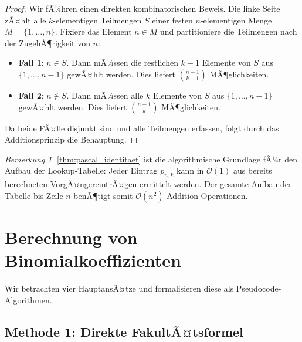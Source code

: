 ﻿\documentclass[12pt, a4paper]{article}
\newcommand{\Oh}{\mathcal{O}}
\theoremstyle{plain}
\theoremstyle{definition}
\theoremstyle{remark}
\newtheorem{bemerkung}[theorem]{Bemerkung}
\renewcommand{\Oh}{\mathcal{O}}
\begin{document}
\begin{proof}
  Wir fÃ¼hren einen direkten kombinatorischen Beweis. Die linke Seite
  zÃ¤hlt alle $k$-elementigen Teilmengen $S$ einer festen
  $n$-elementigen Menge $M = \{1, \ldots, n\}$. Fixiere das Element
  $n \in M$ und partitioniere die Teilmengen nach der ZugehÃ¶rigkeit
  von $n$:
  \begin{itemize}
    \item \textbf{Fall 1}: $n \in S$. Dann mÃ¼ssen die restlichen
          $k-1$ Elemente von $S$ aus $\{1,\ldots,n-1\}$ gewÃ¤hlt werden.
          Dies liefert $\binom{n-1}{k-1}$ MÃ¶glichkeiten.
    \item \textbf{Fall 2}: $n \notin S$. Dann mÃ¼ssen alle $k$ Elemente
          von $S$ aus $\{1,\ldots,n-1\}$ gewÃ¤hlt werden. Dies liefert
          $\binom{n-1}{k}$ MÃ¶glichkeiten.
  \end{itemize}
  Da beide FÃ¤lle disjunkt sind und alle Teilmengen erfassen, folgt
  durch das Additionsprinzip die Behauptung.
\end{proof}

\begin{bemerkung}
  \cref{thm:pascal_identitaet} ist die algorithmische Grundlage fÃ¼r
  den Aufbau der Lookup-Tabelle: Jeder Eintrag $p_{n,k}$ kann in
  $\Oh(1)$ aus bereits berechneten VorgÃ¤ngereintrÃ¤gen ermittelt
  werden. Der gesamte Aufbau der Tabelle bis Zeile $n$ benÃ¶tigt
  somit $\Oh(n^2)$ Addition-Operationen.
\end{bemerkung}


\section{Berechnung von Binomialkoeffizienten}
\label{sec:algorithmen}

Wir betrachten vier HauptansÃ¤tze und formalisieren diese als
Pseudocode-Algorithmen.

\subsection{Methode 1: Direkte FakultÃ¤tsformel}
\label{subsec:algo_fakultaet}
\end{document}
